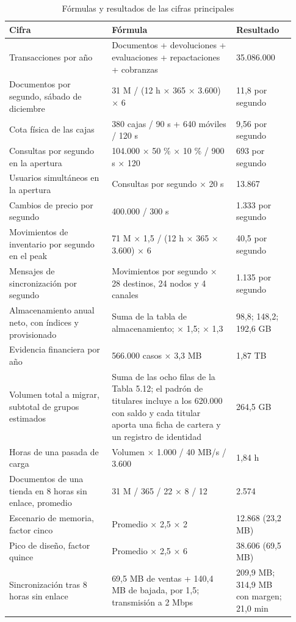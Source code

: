 \documentclass[11pt]{article}
\begin{document}
\begin{table}[htbp]
\caption{Fórmulas y resultados de las cifras principales}\label{tab:formulas}
\centering
\begin{tabular}{@{}p{0.333\linewidth}p{0.404\linewidth}p{0.190\linewidth}@{}}
\toprule Cifra & Fórmula & Resultado \\
\midrule
Transacciones por año & Documentos + devoluciones + evaluaciones + repactaciones + cobranzas & 35.086.000 \\
Documentos por segundo, sábado de diciembre & 31 M / (12 h × 365 × 3.600) × 6 & 11,8 por segundo \\
Cota física de las cajas & 380 cajas / 90 s + 640 móviles / 120 s & 9,56 por segundo \\
Consultas por segundo en la apertura & 104.000 × 50 \% × 10 \% / 900 s × 120 & 693 por segundo \\
Usuarios simultáneos en la apertura & Consultas por segundo × 20 s & 13.867 \\
Cambios de precio por segundo & 400.000 / 300 s & 1.333 por segundo \\
Movimientos de inventario por segundo en el peak & 71 M × 1,5 / (12 h × 365 × 3.600) × 6 & 40,5 por segundo \\
Mensajes de sincronización por segundo & Movimientos por segundo × 28 destinos, 24 nodos y 4 canales & 1.135 por segundo \\
Almacenamiento anual neto, con índices y provisionado & Suma de la tabla de almacenamiento; × 1,5; × 1,3 & 98,8; 148,2; 192,6 GB \\
Evidencia financiera por año & 566.000 casos × 3,3 MB & 1,87 TB \\
Volumen total a migrar, subtotal de grupos estimados & Suma de las ocho filas de la Tabla 5.12; el padrón de titulares incluye a los 620.000 con saldo y cada titular aporta una ficha de cartera y un registro de identidad & 264,5 GB \\
Horas de una pasada de carga & Volumen × 1.000 / 40 MB/s / 3.600 & 1,84 h \\
Documentos de una tienda en 8 horas sin enlace, promedio & 31 M / 365 / 22 × 8 / 12 & 2.574 \\
Escenario de memoria, factor cinco & Promedio × 2,5 × 2 & 12.868 (23,2 MB) \\
Pico de diseño, factor quince & Promedio × 2,5 × 6 & 38.606 (69,5 MB) \\
Sincronización tras 8 horas sin enlace & 69,5 MB de ventas + 140,4 MB de bajada, por 1,5; transmisión a 2 Mbps & 209,9 MB; 314,9 MB con margen; 21,0 min \\

\end{tabular}
\end{table}
\end{document}
